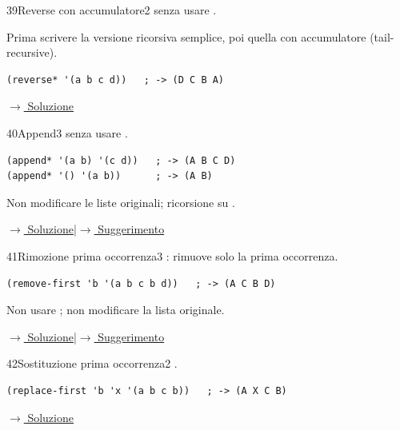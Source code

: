 \label{ex:39}
\begin{essbox}{39}{Reverse con accumulatore}{2}
  senza usare .

Prima scrivere la versione ricorsiva semplice, poi quella
con accumulatore (tail-recursive).
\begin{lstlisting}
(reverse* '(a b c d))   ; -> (D C B A)
\end{lstlisting}

\small\color{black!55}\hyperref[sol:39]{$\rightarrow$ Soluzione}\normalsize\color{black}
\end{essbox}

\label{ex:40}
\begin{essbox}{40}{Append}{3}
  senza usare .
\nopagebreak
\begin{lstlisting}
(append* '(a b) '(c d))   ; -> (A B C D)
(append* '() '(a b))      ; -> (A B)
\end{lstlisting}
Non modificare le liste originali; ricorsione su .



\small\color{black!55}\hyperref[sol:40]{$\rightarrow$ Soluzione}\enspace\textcolor{black!30}{|}\enspace\hyperref[hint:40]{$\rightarrow$ Suggerimento}\normalsize\color{black}
\end{essbox}

\label{ex:41}
\begin{stdbox}{41}{Rimozione prima occorrenza}{3}
 : rimuove solo la
prima occorrenza.
\begin{lstlisting}
(remove-first 'b '(a b c b d))   ; -> (A C B D)
\end{lstlisting}
Non usare ; non modificare la lista originale.



\small\color{black!55}\hyperref[sol:41]{$\rightarrow$ Soluzione}\enspace\textcolor{black!30}{|}\enspace\hyperref[hint:41]{$\rightarrow$ Suggerimento}\normalsize\color{black}
\end{stdbox}

\label{ex:42}
\begin{colbox}{42}{Sostituzione prima occorrenza}{2}
 .
\nopagebreak
\begin{lstlisting}
(replace-first 'b 'x '(a b c b))   ; -> (A X C B)
\end{lstlisting}


\small\color{black!55}\hyperref[sol:42]{$\rightarrow$ Soluzione}\normalsize\color{black}
\end{colbox}

